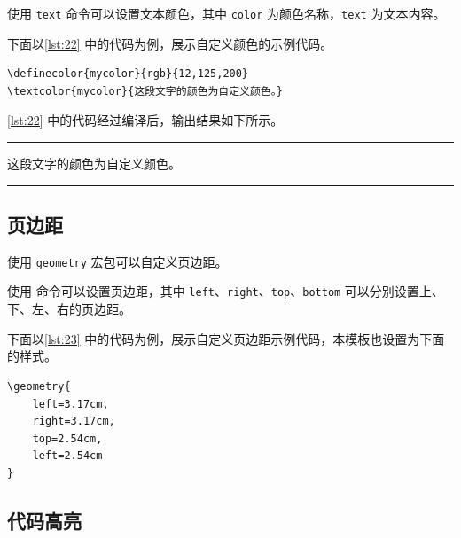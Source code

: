 \documentclass[a4paper]{article}
\begin{document}
使用 \texttt{\textcolor{color}{text}} 命令可以设置文本颜色，其中 \texttt{color} 为颜色名称，\texttt{text} 为文本内容。

下面以\cref{lst:22} 中的代码为例，展示自定义颜色的示例代码。

\begin{center}
    \label{lst:22}
    \begin{verbatim}
\definecolor{mycolor}{rgb}{12,125,200}
\textcolor{mycolor}{这段文字的颜色为自定义颜色。}
    \end{verbatim}
\end{center}

\cref{lst:22} 中的代码经过编译后，输出结果如下所示。

\vspace{0.75cm}
\hrule
\vspace{0.25cm}

\textcolor{mycolor}{这段文字的颜色为自定义颜色。}

\vspace{0.25cm}
\hrule
\vspace{0.25cm}

\subsection{页边距}

使用 \texttt{geometry} 宏包可以自定义页边距。

使用 \texttt{\geometry{left=...,right=...,top=...,bottom=...}} 命令可以设置页边距，其中 \texttt{left}、\texttt{right}、\texttt{top}、\texttt{bottom} 可以分别设置上、下、左、右的页边距。

下面以\cref{lst:23} 中的代码为例，展示自定义页边距示例代码，本模板也设置为下面的样式。

\begin{center}
    \label{lst:23}
    \begin{verbatim}
\geometry{
    left=3.17cm,
    right=3.17cm,
    top=2.54cm,
    left=2.54cm
}
    \end{verbatim}
\end{center}

\subsection{代码高亮}
\end{document}
